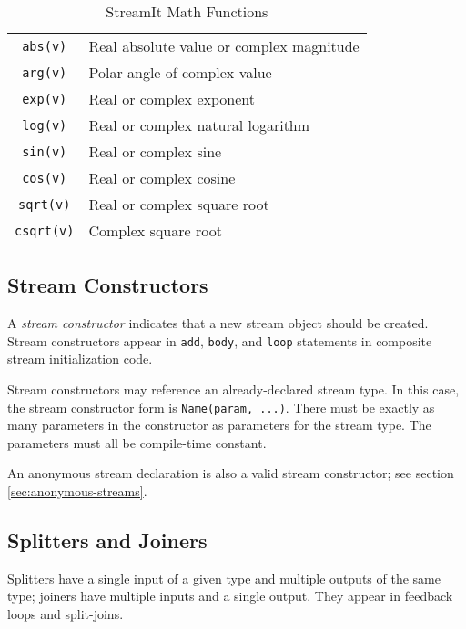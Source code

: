 \documentclass[11pt]{article}
\begin{document}
\begin{table}[htbp]
  \begin{center}
    \begin{tabular}{cl}
      \toprule
      \texttt{abs(v)} & Real absolute value or complex magnitude \\
      \texttt{arg(v)} & Polar angle of complex value \\
      \texttt{exp(v)} & Real or complex exponent \\
      \texttt{log(v)} & Real or complex natural logarithm \\
      \texttt{sin(v)} & Real or complex sine \\
      \texttt{cos(v)} & Real or complex cosine \\
      \texttt{sqrt(v)} & Real or complex square root \\
      \texttt{csqrt(v)} & Complex square root \\
      \bottomrule
    \end{tabular}
    \caption{StreamIt Math Functions}
    \label{tab:math-functions}
  \end{center}
\end{table}

\subsection{Stream Constructors}
\label{sec:expr-stream-constructor}

A \emph{stream constructor} indicates that a new stream object should
be created.  Stream constructors appear in \lstinline|add|,
\lstinline|body|, and \lstinline|loop| statements in composite stream
initialization code.

Stream constructors may reference an already-declared stream type.  In
this case, the stream constructor form is \lstinline|Name(param, ...)|.
There must be exactly as many parameters in the constructor as
parameters for the stream type.  The parameters must all be
compile-time constant.

An anonymous stream declaration is also a valid stream constructor;
see section \ref{sec:anonymous-streams}.

\subsection{Splitters and Joiners}
\label{sec:expr-splitters-joiners}

Splitters have a single input of a given type and multiple outputs of
the same type; joiners have multiple inputs and a single output.  They
appear in feedback loops and split-joins.
\end{document}
